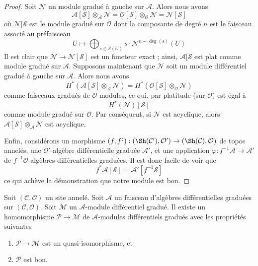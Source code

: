 \begin{proof}
Soit $\mathcal{N}$ un module gradué à gauche sur $\mathcal{A}$.
Alors nous
avons $$
\mathcal{A}[\mathcal{S}] \otimes_\mathcal{A} \mathcal{N} =
\mathcal{O}[\mathcal{S}] \otimes_\mathcal{O} \mathcal{N} =
\mathcal{N}[\mathcal{S}]
$$
où $\mathcal{N}[\mathcal{S}$ est le module
gradué sur $\mathcal{O}$ dont la composante de degré $n$
est le faisceau associé au préfaisceau
$$ U
\longmapsto
\bigoplus\nolimits_{s \in \mathcal{S}(U)} s \cdot \mathcal{N}^{n - \deg(s)}(U)
$$ Il est
clair que $\mathcal{N} \to \mathcal{N}[\mathcal{S}]$ est un foncteur
exact ; ainsi, $\mathcal{A}[\mathcal{S}$ est plat comme module
gradué sur $\mathcal{A}$. Supposons maintenant que $\mathcal{N}$ soit un
module différentiel gradué à gauche sur $\mathcal{A}$. Alors nous avons
$$
H^*(\mathcal{A}[\mathcal{S}] \otimes_\mathcal{A} \mathcal{N}) =
H^*(\mathcal{O}[\mathcal{S}] \otimes_\mathcal{O} \mathcal{N})
$$
comme faisceaux gradués de $\mathcal{O}$-modules, ce qui, par platitude
(sur $\mathcal{O})$ est égal à
$$
H^*(\mathcal{N})[\mathcal{S}]
$$ comme module
gradué sur $\mathcal{O}$. Par conséquent, si $\mathcal{N}$ est acyclique,
alors $\mathcal{A}[\mathcal{S}] \otimes_\mathcal{A} \mathcal{N}$ est
acyclique.

\medskip\noindent
Enfin, considérons un morphisme
$(f, f^\sharp) : (\Sh(\mathcal{C}'), \mathcal{O}')
\to (\Sh(\mathcal{C}), \mathcal{O})$ de
topos annelés, une $\mathcal{O}'$-algèbre différentielle graduée
$\mathcal{A}'$, et une application $\varphi : f^{-1}\mathcal{A} \to \mathcal{A}'$
de $f^{-1}\mathcal{O}$-algèbres différentielles
graduées. Il est donc facile de voir que
$$
f^*\mathcal{A}[\mathcal{S}] = \mathcal{A}'[f^{-1}\mathcal{S}]
$$ ce
qui achève la démonstration que notre module est bon.
\end{proof}

\begin{lemma}
\label{lemma-resolve}
Soit $(\mathcal{C}, \mathcal{O})$ un site annelé.
Soit $\mathcal{A}$ un faisceau d'algèbres différentielles graduées
sur $(\mathcal{C}, \mathcal{O})$. Soit $\mathcal{M}$
un $\mathcal{A}$-module différentiel gradué. Il existe un homomorphisme
$\mathcal{P} \to \mathcal{M}$ de $\mathcal{A}$-modules différentiels gradués
avec les propriétés suivantes
\begin{enumerate}
\item $\mathcal{P} \to \mathcal{M}$ est un quasi-isomorphisme, et
\item $\mathcal{P}$ est bon.
\end{enumerate}
\end{lemma}

